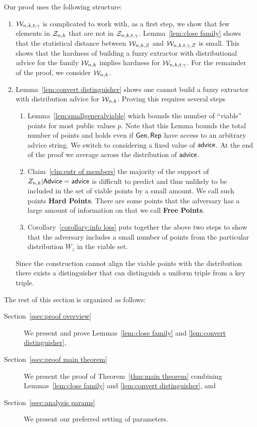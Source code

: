 Our proof uses the following structure:
\begin{enumerate}

\item $\mathcal{W}_{n,k,t,\gamma}$ is complicated to work with, as a first step, we show that few elements in $\mathcal{Z}_{n,k}$ that are not in $\mathcal{Z}_{n,k,t,\gamma}$. Lemma~\ref{lem:close family} shows that the statistical distance between $\mathcal{W}_{n,k, Z}$ and $\mathcal{W}_{n,k,t,\gamma, Z}$ is small.  This shows that the hardness of building a fuzzy extractor with distributional advice for the family $\mathcal{W}_{n,k}$ implies hardness for $\mathcal{W}_{n,k,t,\gamma}$. For the remainder of the proof, we consider $\mathcal{W}_{n,k}$.
\item Lemma~\ref{lem:convert distinguisher} shows one cannot build a fuzzy extractor with distribution advice for $\mathcal{W}_{n,k}$. Proving this requires several steps
\begin{enumerate}
\item Lemma~\ref{lem:smallgeneralviable} which bounds the number of ``viable'' points for most public values $p$.  Note that this Lemma bounds the total number of points and holds even if ${\mathsf{Gen}}, {\mathsf{Rep}}$ have access to an arbitrary advice string. We switch to considering a fixed value of ${\mathsf{advice}}$.  At the end of the proof we average across the distribution of ${\mathsf{advice}}$.

\item Claim~\ref{clm:entr of members} the majority of the support of $Z_{n,k} | {\mathsf{Advice}} = {\mathsf{advice}}$ is difficult to predict and thus unlikely to be included in the set of viable points by a small amount. We call such points \textbf{Hard Points}.  There are some points that the adversary has a large amount of information on that we call \textbf{Free Points}.

\item Corollary~\ref{corollary:info loss} puts together the above two steps to show that the adversary includes a small number of points from the particular distribution $W_z$ in the viable set. 

\end{enumerate}

Since the construction cannot align the viable points with the distribution there exists a distinguisher that can distinguish a uniform triple from a key triple. 
\end{enumerate}

\noindent
The rest of this section is organized as follows:
\begin{description}
\item[Section~\ref{ssec:proof overview}] We present and prove Lemmas~\ref{lem:close family} and \ref{lem:convert distinguisher},
\item[Section~\ref{ssec:proof main theorem}] We present the proof of Theorem~\ref{thm:main theorem} combining Lemmas~\ref{lem:close family} and \ref{lem:convert distinguisher}, and 
\item[Section~\ref{ssec:analysis params}] We present our preferred setting of parameters.
\end{description}

